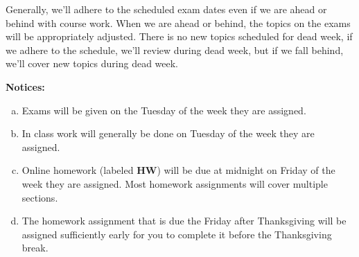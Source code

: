 \documentclass[12pt]{article}
\newcounter{ex}\setcounter{ex}{0}
\newenvironment{alphalist}{
  \begin{enumerate}[(a)]
    \addtolength{\itemsep}{-0.5\itemsep}}
  {\end{enumerate}}
\begin{document}
Generally, we'll adhere to the scheduled exam dates even if we are ahead or behind with course work.  When we are ahead or behind, the
topics on the exams will be appropriately adjusted.  There is no new topics scheduled for dead week, if we adhere to the schedule, we'll review during dead week, but
if we fall behind, we'll cover new topics during dead week.


\vspace{0.1in}
\noindent \textbf{Notices:}


\begin{alphalist}
   \item Exams will be given on the Tuesday of the week they are assigned.
   
   \item In class work  will generally be 
    done on Tuesday of the week they are assigned.

    \item Online homework (labeled \textbf{HW}) will be due at midnight on
          Friday of the week they are assigned. Most homework assignments will
          cover multiple sections. 

    \item The homework assignment that is due the Friday after Thanksgiving
          will be assigned sufficiently early for you to complete it before
          the Thanksgiving break.
\end{alphalist}

\vspace{0.1in}
\end{document}
